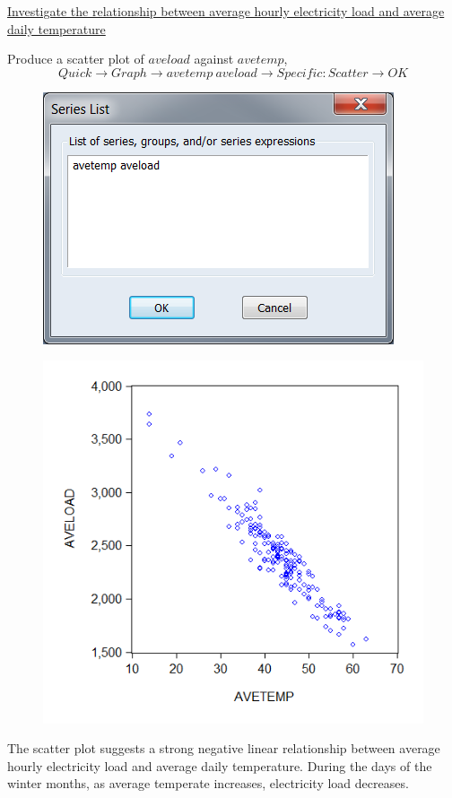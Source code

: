 \documentclass[12pt]{report}
\begin{document}
\noindent \uline{Investigate the relationship between average hourly electricity load and average daily temperature}

\noindent Produce a scatter plot of $aveload$ against $avetemp$,
$$Quick \to Graph \to avetemp\ aveload \to Specific: Scatter \to OK$$
\begin{figure}[H]
	\centerline{\includegraphics{q1_15}}
\end{figure}
\vspace{-\baselineskip}
\begin{figure}[H]
	\centerline{\includegraphics{q1_16}}
\end{figure}
\vspace{-\baselineskip}
\noindent The scatter plot suggests a strong negative linear relationship between average hourly electricity load and average daily temperature. During the days of the winter months, as average temperate increases, electricity load decreases.
\end{document}
